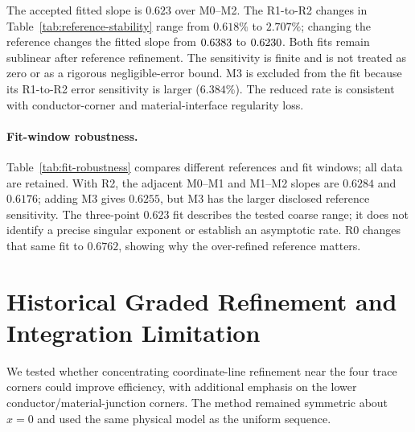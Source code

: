 \documentclass[11pt]{article}
\begin{document}
\begin{table}[H]
\centering
\small
\caption{Reference stability in the M0--M2 fit window. R0=M4, R1=M5 and R2=M6. The last column is $|E_{\rm rel}^{R2}-E_{\rm rel}^{R1}|/|E_{\rm rel}^{R2}|$; each relative error is normalised as in~\eqref{eq:relative-energy}.}
\label{tab:reference-stability}

\end{table}

The accepted fitted slope is $0.623$ over M0--M2. The R1-to-R2 changes in Table~\ref{tab:reference-stability} range from $0.618\%$ to $2.707\%$; changing the reference changes the fitted slope from $0.6383$ to $0.6230$. Both fits remain sublinear after reference refinement. The sensitivity is finite and is not treated as zero or as a rigorous negligible-error bound. M3 is excluded from the fit because its R1-to-R2 error sensitivity is larger ($6.384\%$). The reduced rate is consistent with conductor-corner and material-interface regularity loss.

\paragraph{Fit-window robustness.}
Table~\ref{tab:fit-robustness} compares different references and fit windows; all data are retained. With R2, the adjacent M0--M1 and M1--M2 slopes are $0.6284$ and $0.6176$; adding M3 gives $0.6255$, but M3 has the larger disclosed reference sensitivity. The three-point $0.623$ fit describes the tested coarse range; it does not identify a precise singular exponent or establish an asymptotic rate. R0 changes that same fit to $0.6762$, showing why the over-refined reference matters.
\begin{table}[H]\centering\small
\caption{Existing-data sensitivity of the uniform energy fit. The accepted M0--M2/R2 fit is unchanged; the other rows test its interpretation.}
\label{tab:fit-robustness}
\end{table}

\section{Historical Graded Refinement and Integration Limitation}
\label{sec:historical-graded}
We tested whether concentrating coordinate-line refinement near the four trace corners could improve efficiency, with additional emphasis on the lower conductor/material-junction corners. The method remained symmetric about $x=0$ and used the same physical model as the uniform sequence.
\end{document}
